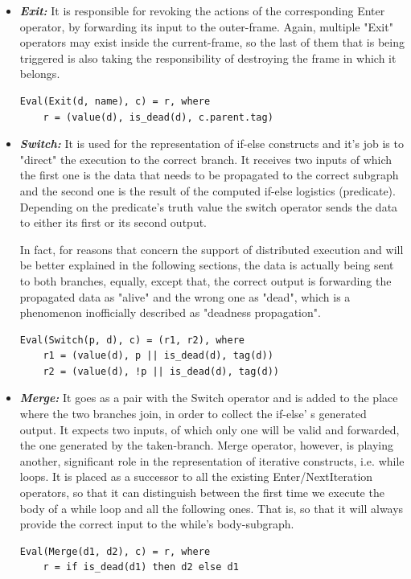 \documentclass[ack,preface]{dithesis}
\begin{document}
\begin{itemize}
    \item \textit{\textbf{Exit:}} It  is responsible for revoking the actions of the corresponding Enter operator, by forwarding its input to the outer-frame.
 Again, multiple "Exit" operators may exist inside the current-frame, so the last of them that is being triggered is also taking the responsibility of destroying the frame in which it belongs.
\begin{lstlisting}
Eval(Exit(d, name), c) = r, where
	r = (value(d), is_dead(d), c.parent.tag)
\end{lstlisting}

    \item \textit{\textbf{Switch:}} It is used for the representation of if-else constructs and it's job is to "direct" the execution to the correct branch. It receives two inputs of which the first one is the data that needs to be propagated to the correct subgraph and the second one is the result of the computed if-else logistics  (predicate). Depending on the predicate's truth value the switch operator sends the data to either its first or its second output. 

In fact, for reasons that concern the support of distributed execution and will be better explained in the following sections,  the data is actually being sent to both branches, equally, 
except that, the correct output is forwarding the propagated data as "alive" and the wrong one as "dead", which is a phenomenon inofficially described as "deadness propagation".
\begin{lstlisting}
Eval(Switch(p, d), c) = (r1, r2), where
	r1 = (value(d), p || is_dead(d), tag(d))
	r2 = (value(d), !p || is_dead(d), tag(d))
\end{lstlisting}


    \item \textit{\textbf{Merge:}} It goes as a pair with the Switch operator and is added to the place where the two branches join, in order to collect the if-else' s generated output. It expects two inputs, of which only one will be valid and forwarded, the one generated by the taken-branch. Merge operator, however, is playing another, significant role in the representation of iterative constructs, i.e. while loops. It is placed as a successor to all the existing Enter/NextIteration operators, so that it can distinguish between the first time we execute the body of a while loop and all the following ones. That is, so that  it will always provide the correct input to the while's body-subgraph. 
\begin{lstlisting}
Eval(Merge(d1, d2), c) = r, where
	r = if is_dead(d1) then d2 else d1
\end{lstlisting}

    \end{itemize}
\end{document}
